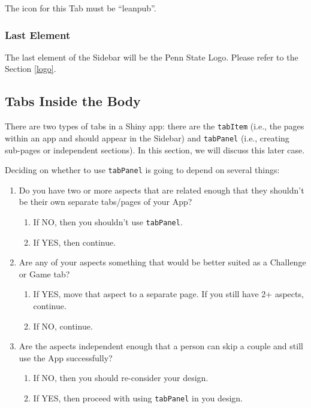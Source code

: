 \documentclass[]{book}
\providecommand{\tightlist}{%
  \setlength{\itemsep}{0pt}\setlength{\parskip}{0pt}}
\begin{document}
The icon for this Tab must be ``leanpub''.

\hypertarget{last-element}{%
\subsubsection{Last Element}\label{last-element}}

The last element of the Sidebar will be the Penn State Logo. Please refer to the Section \ref{logo}.

\hypertarget{tabs-inside-the-body}{%
\subsection{Tabs Inside the Body}\label{tabs-inside-the-body}}

There are two types of tabs in a Shiny app: there are the \texttt{tabItem} (i.e., the pages within an app and should appear in the Sidebar) and \texttt{tabPanel} (i.e., creating sub-pages or independent sections). In this section, we will discuss this later case.

Deciding on whether to use \texttt{tabPanel} is going to depend on several things:

\begin{enumerate}
\def\labelenumi{\arabic{enumi}.}
\tightlist
\item
  Do you have two or more aspects that are related enough that they shouldn't be their own separate tabs/pages of your App?

  \begin{enumerate}
  \def\labelenumii{\alph{enumii}.}
  \tightlist
  \item
    If NO, then you shouldn't use \texttt{tabPanel}.\\
  \item
    If YES, then continue.
  \end{enumerate}
\item
  Are any of your aspects something that would be better suited as a Challenge or Game tab?

  \begin{enumerate}
  \def\labelenumii{\alph{enumii}.}
  \tightlist
  \item
    If YES, move that aspect to a separate page. If you still have 2+ aspects, continue.\\
  \item
    If NO, continue.\\
  \end{enumerate}
\item
  Are the aspects independent enough that a person can skip a couple and still use the App successfully?

  \begin{enumerate}
  \def\labelenumii{\alph{enumii}.}
  \tightlist
  \item
    If NO, then you should re-consider your design.\\
  \item
    If YES, then proceed with using \texttt{tabPanel} in you design.
  \end{enumerate}
\end{enumerate}
\end{document}
